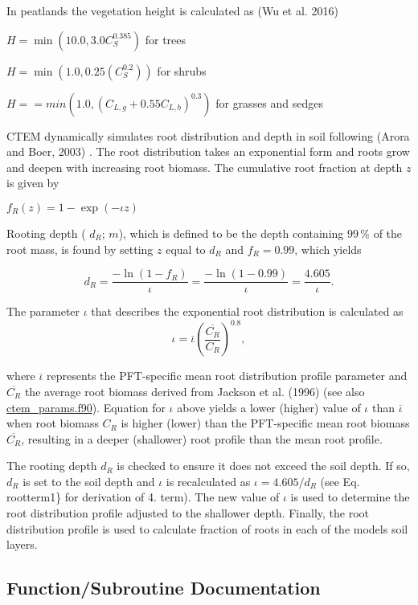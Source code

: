In peatlands the vegetation height is calculated as (Wu et al. 2016) \cite{Wu2016-zt}

$ H = \min(10.0,3.0C_S^{0.385}) $ for trees

$ H = \min(1.0, 0.25(C_S^{0.2})) $ for shrubs

$ H = = min(1.0,(C_{L,g}+0.55C_{L,b})^{0.3}) $ for grasses and sedges

C\+T\+E\+M dynamically simulates root distribution and depth in soil following (Arora and Boer, 2003) \cite{Arora2003838}. The root distribution takes an exponential form and roots grow and deepen with increasing root biomass. The cumulative root fraction at depth $z$ is given by

$ f_R(z) = 1 - \exp(-\iota z) $

Rooting depth ( $d_R$; $m$), which is defined to be the depth containing $99\,{\%}$ of the root mass, is found by setting $z$ equal to $d_R$ and $f_R = 0.99$, which yields

\[ \label{rootterm1} d_R = \frac{-\ln(1-f_R)}{\iota} = \frac{-\ln(1 - 0.99)}{\iota} = \frac{4.605}{\iota}. \]

The parameter $\iota$ that describes the exponential root distribution is calculated as \[ \label{iota} \iota = \overline{\iota} \left(\frac{\overline{C_R}}{C_R} \right)^{0.8}, \]

where $\overline{\iota}$ represents the P\+F\+T-\/specific mean root distribution profile parameter and $\overline{C_R}$ the average root biomass derived from Jackson et al. (1996) \cite{Jackson1996-va} (see also \hyperlink{ctem__params_8f90}{ctem\+\_\+params.\+f90}). Equation for $\iota$ above yields a lower (higher) value of $\iota$ than $\overline{\iota}$ when root biomass $C_R$ is higher (lower) than the P\+F\+T-\/specific mean root biomass $\overline{C_R}$, resulting in a deeper (shallower) root profile than the mean root profile.

The rooting depth $d_R$ is checked to ensure it does not exceed the soil depth. If so, $d_R$ is set to the soil depth and $\iota$ is recalculated as $\iota = 4.605/d_R$ (see Eq. rootterm1\} for derivation of 4. term). The new value of $\iota$ is used to determine the root distribution profile adjusted to the shallower depth. Finally, the root distribution profile is used to calculate fraction of roots in each of the model\textquotesingle{}s soil layers. 

\subsection{Function/\+Subroutine Documentation}
\hypertarget{bio2str_8f_a3bc457fd89cd3f3af038e068b38b5919}{}
